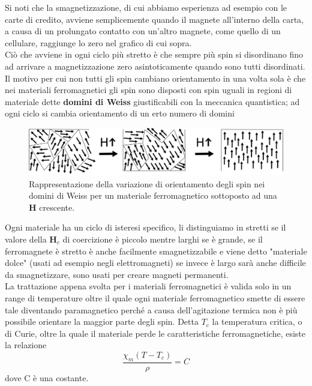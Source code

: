 \documentclass[
10pt, %
a4paper, %
oneside, %
headinclude,footinclude, %
BCOR5mm, %
]{scrartcl}
\begin{document}
\FloatBarrier
Si noti che la smagnetizzazione, di cui abbiamo esperienza ad esempio con le carte di credito, avviene semplicemente quando il magnete all'interno della carta, a causa di un prolungato contatto con un'altro magnete, come quello di un cellulare, raggiunge lo zero nel grafico di cui sopra.\\
Ciò che avviene in ogni ciclo più stretto è che sempre più spin si disordinano fino ad arrivare a magnetizzazione zero asintoticamente quando sono tutti disordinati. Il motivo per cui non tutti gli spin cambiano orientamento in una volta sola è che nei materiali ferromagnetici gli spin sono disposti con spin uguali in regioni di materiale dette \textbf{domini di Weiss} giustificabili con la meccanica quantistica; ad ogni ciclo si cambia orientamento di un erto numero di domini
\begin{figure}[h!]
	\centering
	\includegraphics[width=0.6\linewidth]{"images/domini di weiss"}
	\caption{Rappresentazione della variazione di orientamento degli spin nei domini di Weiss per un materiale ferromagnetico sottoposto ad una \(\mathbf{H}\) crescente.}
	\label{fig:domini-di-weiss}
\end{figure}
\FloatBarrier
Ogni materiale ha un ciclo di isteresi specifico, li distinguiamo in stretti se il valore della \(\mathbf{H}_c\) di coercizione è piccolo mentre larghi se è grande, se il ferromagnete è stretto è anche facilmente smagnetizzabile e viene detto "materiale dolce" (usati ad esempio negli elettromagneti) se invece è largo sarà anche difficile da smagnetizzare, sono usati per creare magneti permanenti.\\
La trattazione appena svolta per i materiali ferromagnetici è valida solo in un range di temperature oltre il quale ogni materiale ferromagnetico smette di essere tale diventando paramagnetico perché a causa dell'agitazione termica non è più possibile orientare la maggior parte degli spin. Detta \(T_c\) la temperatura critica, o di Curie, oltre la quale il materiale perde le caratteristiche ferromagnetiche, esiste la relazione
\[\frac{\chi_m(T-T_c)}{\rho} = C\] 
dove C è una costante. 
\end{document}

